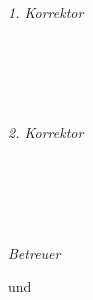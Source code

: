 \begin{titlepage}
	\centering

	\vfill
	{\large \thesisSubject} \\[5mm]
	{\LARGE \color{ctcolortitle}\textbf{\thesisTitle} \\[10mm]}
	{\Large \thesisName} \\

	\vfill
	\begin{minipage}[t]{.27\textwidth}
		\raggedleft\
		\textit{1. Korrektor}
	\end{minipage}
	\hspace*{15pt}
	\begin{minipage}[t]{.65\textwidth}
		{\Large \thesisFirstReviewer} \\
	  	{\small \thesisFirstReviewerDepartment} \\[-1mm]
		{\small \thesisFirstReviewerUniversity}
	\end{minipage} \\[5mm]
	\begin{minipage}[t]{.27\textwidth}
		\raggedleft\
		\textit{2. Korrektor}
	\end{minipage}
	\hspace*{15pt}
	\begin{minipage}[t]{.65\textwidth}
		{\Large \thesisSecondReviewer} \\
	  	{\small \thesisSecondReviewerDepartment} \\[-1mm]
		{\small \thesisSecondReviewerUniversity}
	\end{minipage} \\[10mm]
	\begin{minipage}[t]{.27\textwidth}
		\raggedleft\
		\textit{Betreuer}
	\end{minipage}
	\hspace*{15pt}
	\begin{minipage}[t]{.65\textwidth}
		\thesisFirstSupervisor\ und \thesisSecondSupervisor\
	\end{minipage} \\[10mm]

	\thesisDate\\ %

\end{titlepage}



